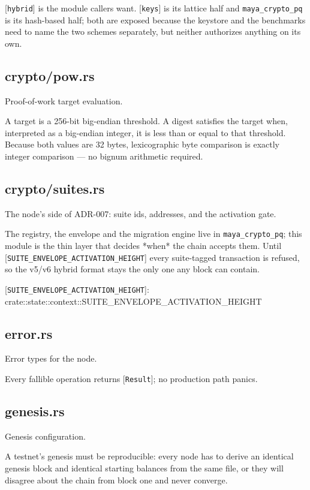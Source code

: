 \documentclass[11pt,a4paper]{article}
\begin{document}
[\texttt{hybrid}] is the module callers want. [\texttt{keys}] is its lattice half and
\texttt{maya\_crypto\_pq} is its hash-based half; both are exposed because the
keystore and the benchmarks need to name the two schemes separately, but
neither authorizes anything on its own.

\subsection{crypto/pow.rs}
Proof-of-work target evaluation.

A target is a 256-bit big-endian threshold. A digest satisfies the target
when, interpreted as a big-endian integer, it is less than or equal to that
threshold. Because both values are 32 bytes, lexicographic byte comparison
is exactly integer comparison — no bignum arithmetic required.

\subsection{crypto/suites.rs}
The node's side of ADR-007: suite ids, addresses, and the activation gate.

The registry, the envelope and the migration engine live in
\texttt{maya\_crypto\_pq}; this module is the thin layer that decides *when* the
chain accepts them. Until [\texttt{SUITE\_ENVELOPE\_ACTIVATION\_HEIGHT}] every
suite-tagged transaction is refused, so the v5/v6 hybrid format stays the
only one any block can contain.

[\texttt{SUITE\_ENVELOPE\_ACTIVATION\_HEIGHT}]: crate::state::context::SUITE\_ENVELOPE\_ACTIVATION\_HEIGHT

\subsection{error.rs}
Error types for the node.

Every fallible operation returns [\texttt{Result}]; no production path panics.

\subsection{genesis.rs}
Genesis configuration.

A testnet's genesis must be reproducible: every node has to derive an
identical genesis block and identical starting balances from the same file,
or they will disagree about the chain from block one and never converge.
\end{document}
